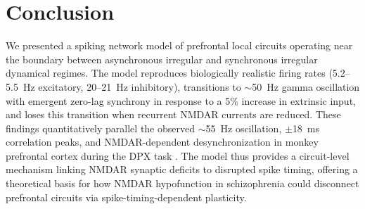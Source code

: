 \documentclass[10pt]{article}
\begin{document}
\section{Conclusion}

We presented a spiking network model of prefrontal local circuits operating
near the boundary between asynchronous irregular and synchronous irregular
dynamical regimes. The model reproduces biologically realistic firing rates
(5.2--5.5~Hz excitatory, 20--21~Hz inhibitory), transitions to $\sim$50~Hz
gamma oscillation with emergent zero-lag synchrony in response to a 5\%
increase in extrinsic input, and loses this transition when recurrent NMDAR
currents are reduced. These findings quantitatively parallel the observed
$\sim$55~Hz oscillation, $\pm$18~ms correlation peaks, and NMDAR-dependent
desynchronization in monkey prefrontal cortex during the DPX task
\citep{zick2018blocking}. The model thus provides a circuit-level mechanism
linking NMDAR synaptic deficits to disrupted spike timing, offering a
theoretical basis for how NMDAR hypofunction in schizophrenia could
disconnect prefrontal circuits via spike-timing-dependent plasticity.



\end{document}
